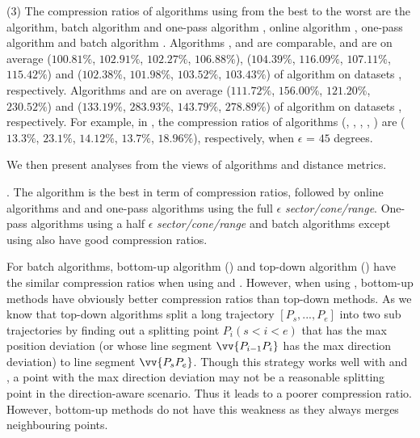 \sstab(3) The compression ratios of algorithms using \dad from the best
to the worst are the \opt algorithm, batch algorithm \tpa and
one-pass algorithm \interval, online algorithm \opwa, one-pass algorithm \intersec and batch algorithm \dpa.
%
{Algorithms \tpa, \opwa and \interval are comparable, and are on average
($100.81\%$, $102.91\%$, $102.27\%$, $106.88\%$), ($104.39\%$, $116.09\%$, $107.11\%$, $115.42\%$) and ($102.38\%$, $101.98\%$, $103.52\%$, $103.43\%$)
 of algorithm \opt on datasets \dSets, respectively.}
%
{Algorithms \intersec and \dpa are on average ($111.72\%$, $156.00\%$, $121.20\%$, $230.52\%$) and ($133.19\%$, $283.93\%$, $143.79\%$, $278.89\%$)
 of algorithm \opt on datasets \dSets, respectively.}
%
For example, in \mopsi, the compression ratios of algorithms (\tpa, \dpa, \opwa, \interval, \intersec)
are ($13.3\%$, $23.1\%$, $14.12\%$, $13.7\%$, $18.96\%$), respectively, when $\epsilon$ = $45$ degrees.
%


We then present analyses from the views of \lsa algorithms and distance metrics.

. The \opt algorithm is the best in term of compression ratios, followed by online algorithms \opwa and \bqsa and one-pass algorithms using the full $\epsilon$ \emph{sector/cone/range}. One-pass algorithms using a half $\epsilon$ \emph{sector/cone/range} and batch algorithms except \dpa using \dad also have good compression ratios.

For batch algorithms, bottom-up algorithm (\tpa) and top-down algorithm (\dpa) have the similar compression ratios when using \ped and \sed. However, when using \dad, bottom-up methods have obviously better compression ratios than top-down methods.  As we know that top-down algorithms split a long trajectory $[P_s, ..., P_e]$ into two sub trajectories by finding out a splitting point $P_i (s<i<e)$ that has the max position deviation (or whose line segment $\vv{P_{i-1}P_{i}}$ has the max direction deviation) to line segment $\vv{P_sP_{e}}$. Though this strategy works well with \ped and \sed, a point with the max direction deviation may not be a reasonable splitting point in the direction-aware scenario. Thus it leads to a poorer compression ratio. However, bottom-up methods do not have this weakness as they always merges neighbouring points.



